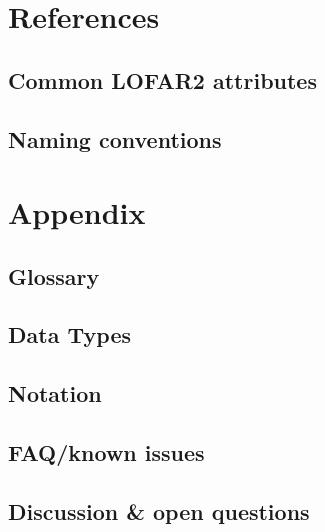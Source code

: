 \documentclass[a4paper,10pt,bibtotoc]{scrartcl}
\begin{document}
\section{References}

\subsection{Common LOFAR2 attributes}

\subsection{Naming conventions}






\clearpage

\appendix
\section{Appendix}

\subsection{Glossary}
\label{sec:glossary}




\subsection{Data Types}


\subsection{Notation}


\subsection{FAQ/known issues}


\subsection{Discussion \& open questions}
\end{document}
